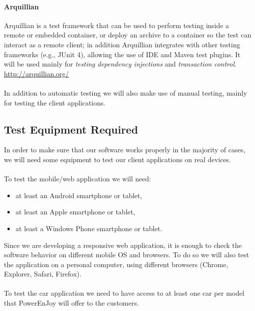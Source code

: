 \documentclass[english]{article}
\begin{document}
\paragraph{Arquillian}
Arquillian is a test framework that can be used to perform testing inside a remote or embedded container, or deploy an archive to a container so the test can interact as a remote client; in addition Arquillian integrates with other testing frameworks (e.g., JUnit 4), allowing the use of IDE and Maven test plugins.
It will be used mainly for \emph{testing dependency injections} and \emph{transaction control}.\\
\url{http://arquillian.org/}

\paragraph{}
In addition to automatic testing we will also make use of manual testing, mainly for testing the client applications.

\newpage
\subsection{Test Equipment Required}
In order to make sure that our software works properly in the majority of cases, we will need some equipment to test our client applications on real devices.

\paragraph{}
To test the mobile/web application we will need:
\begin{itemize}
\item at least an Android smartphone or tablet,
\item at least an Apple smartphone or tablet,
\item at least a Windows Phone smartphone or tablet.
\end{itemize}
Since we are developing a responsive web application, it is enough to check the software behavior on different mobile OS and browsers. To do so we will also test the application on a personal computer, using different browsers (Chrome, Explorer, Safari, Firefox).

\paragraph{}
To test the car application we need to have access to at least one car per model that PowerEnJoy will offer to the customers. 
\end{document}
